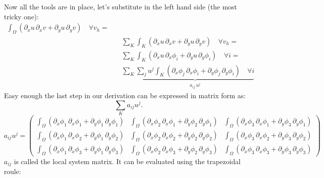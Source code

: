 \documentclass[11pt]{amsart}
\begin{document}
Now all the tools are in place, let's substitute in the left hand side (the most 
tricky one):
\[
\begin{split}
\int_\Omega \left(
\partial_x u\, \partial_x v + 
\partial_y u\, \partial_y v\right)\quad \forall v_h = \\
& \quad \sum_K \int_K \left(
\partial_x u\, \partial_x v + 
\partial_y u\, \partial_y v\right)\quad \forall v_h = \\
& \quad \sum_K \int_K \left(
\partial_x u\, \partial_x \phi_i + 
\partial_y u\, \partial_y \phi_i \right)\quad \forall i = \\
& \quad \sum_K \underbrace{\sum_j u^j  \int_K \left(
\partial_x \phi_j\, \partial_x \phi_i + 
\partial_y \phi_j\, \partial_y \phi_i \right)\quad \forall i}_{a_{ij} \, u^j}
\end{split}
\]
Easy enough the last step in our derivation can be expressed in matrix form as:
\[
\sum_K a_{ij} u^j.
\]
\[
a_{ij} u^j = 
\left(
\begin{array}{ccc}
\int_\Omega \left(
\partial_x \phi_1\, \partial_x \phi_1 + 
\partial_y \phi_1\, \partial_y \phi_1 \right) & 
\int_\Omega \left(
\partial_x \phi_2\, \partial_x \phi_1 + 
\partial_y \phi_2\, \partial_y \phi_1 \right) & 
\int_\Omega \left(
\partial_x \phi_3\, \partial_x \phi_1 + 
\partial_y \phi_3\, \partial_y \phi_1 \right)
\\
\int_\Omega \left(
\partial_x \phi_1\, \partial_x \phi_2 + 
\partial_y \phi_1\, \partial_y \phi_2 \right) & 
\int_\Omega \left(
\partial_x \phi_2\, \partial_x \phi_2 + 
\partial_y \phi_2\, \partial_y \phi_2 \right) & 
\int_\Omega \left(
\partial_x \phi_3\, \partial_x \phi_2 + 
\partial_y \phi_3\, \partial_y \phi_2 \right)\\
\int_\Omega \left(
\partial_x \phi_1\, \partial_x \phi_3 + 
\partial_y \phi_1\, \partial_y \phi_3 \right) & 
\int_\Omega \left(
\partial_x \phi_2\, \partial_x \phi_3 + 
\partial_y \phi_2\, \partial_y \phi_3 \right) & 
\int_\Omega \left(
\partial_x \phi_3\, \partial_x \phi_3 + 
\partial_y \phi_3\, \partial_y \phi_3 \right)
\end{array}
\right)
\]
$a_{ij}$ is called the local system matrix. It can be evaluated using the 
trapezoidal roule:
\end{document}
